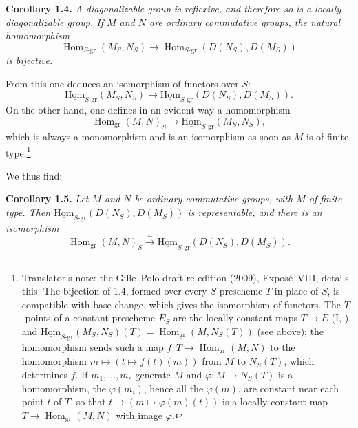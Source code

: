
\medskip
\noindent{}\textbf{Corollary 1.4.}
\textit{A diagonalizable group is reflexive, and therefore so is a locally
diagonalizable group. If \(M\) and \(N\) are ordinary commutative groups,
the natural homomorphism}
\[
  \operatorname{Hom}_{S\text{-}\mathrm{gr}}(M_S,N_S)
  \longrightarrow
  \operatorname{Hom}_{S\text{-}\mathrm{gr}}(D(N_S),D(M_S))
\]
\textit{is bijective.}

From this one deduces an isomorphism of functors over \(S\):
\[
  \operatorname{\underline{Hom}}_{S\text{-}\mathrm{gr}}(M_S,N_S)
  \longrightarrow
  \operatorname{\underline{Hom}}_{S\text{-}\mathrm{gr}}
    (D(N_S),D(M_S)).
\]
On the other hand, one defines in an evident way a homomorphism
\[
  \operatorname{Hom}_{\mathrm{gr}}(M,N)_S
  \longrightarrow
  \operatorname{\underline{Hom}}_{S\text{-}\mathrm{gr}}(M_S,N_S),
\]
which is always a monomorphism and is an isomorphism as soon as \(M\) is of
finite type.\footnote{Translator's note: the Gille--Polo draft re-edition (2009), Expos\'e~VIII,
details this. The bijection of 1.4, formed over every \(S\)-prescheme \(T\) in place of \(S\), is
compatible with base change, which gives the isomorphism of functors. The \(T\)-points of a constant
prescheme \(E_S\) are the locally constant maps \(T\to E\) (I, ), and
\(\operatorname{\underline{Hom}}_{S\text{-}\mathrm{gr}}(M_S,N_S)(T)=\operatorname{Hom}_{\mathrm{gr}}(M,N_S(T))\)
(see above); the homomorphism sends such a map \(f:T\to\operatorname{Hom}_{\mathrm{gr}}(M,N)\) to the homomorphism
\(m\mapsto(t\mapsto f(t)(m))\) from \(M\) to \(N_S(T)\), which determines \(f\). If
\(m_1,\ldots,m_r\) generate \(M\) and \(\varphi:M\to N_S(T)\) is a homomorphism, the
\(\varphi(m_i)\), hence all the \(\varphi(m)\), are constant near each point \(t\) of \(T\), so that
\(t\mapsto(m\mapsto\varphi(m)(t))\) is a locally constant map \(T\to\operatorname{Hom}_{\mathrm{gr}}(M,N)\)
with image \(\varphi\).}

We thus find:

\medskip
\noindent{}\textbf{Corollary 1.5.}
\textit{Let \(M\) and \(N\) be ordinary commutative groups, with \(M\) of
finite type. Then
\(\operatorname{\underline{Hom}}_{S\text{-}\mathrm{gr}}(D(N_S),D(M_S))\) is
representable, and there is an isomorphism}
\[
  \operatorname{Hom}_{\mathrm{gr}}(M,N)_S
  \xrightarrow{\ \sim\ }
  \operatorname{\underline{Hom}}_{S\text{-}\mathrm{gr}}
    (D(N_S),D(M_S)).
\]

